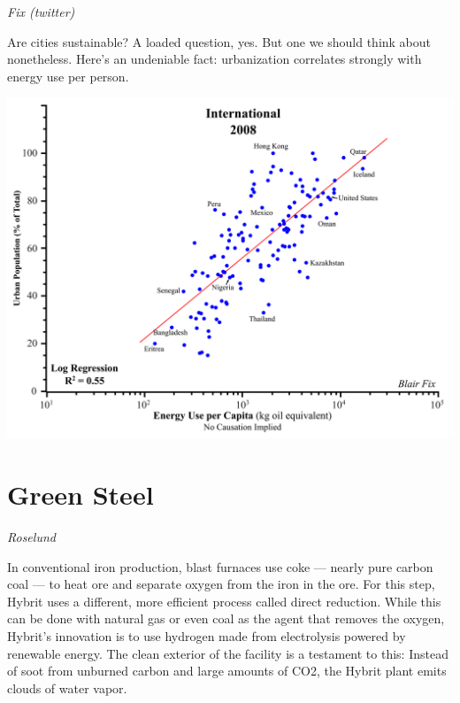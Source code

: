 \documentclass[
]{book}
\begin{document}
\emph{Fix (twitter)}

Are cities sustainable? A loaded question, yes. But one we should think about nonetheless.
Here's an undeniable fact: urbanization correlates strongly with energy use per person.

\includegraphics{fig/Fix_2008_Urban_Energy_Use.png}

\hypertarget{green-steel}{%
\section{Green Steel}\label{green-steel}}

\emph{Roselund}

In conventional iron production, blast furnaces use coke --- nearly pure carbon coal --- to heat ore and separate oxygen from the iron in the ore. For this step, Hybrit uses a different, more efficient process called direct reduction. While this can be done with natural gas or even coal as the agent that removes the oxygen, Hybrit's innovation is to use hydrogen made from electrolysis powered by renewable energy. The clean exterior of the facility is a testament to this: Instead of soot from unburned carbon and large amounts of CO2, the Hybrit plant emits clouds of water vapor.
\end{document}
